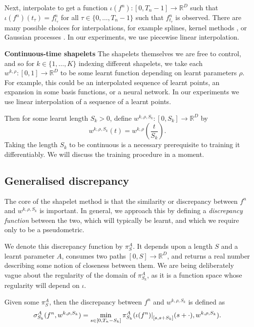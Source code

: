 \documentclass{article}
\theoremstyle{plain}
\theoremstyle{definition}
\newcommand{\reals}{\mathbb{R}}
\newcommand{\restr}[2]{{\left.\kern-\nulldelimiterspace #1 \right|_{#2}}}
\newcommand{\boldheading}[1]{

\textbf{#1}\quad}
\begin{document}
	Next, interpolate to get a function $\iota(f^n) \colon [0, T_n - 1] \to \reals^D$ such that $\iota(f^n)(t_\tau) = f^n_{t_\tau}$ for all $\tau \in \{0, \ldots, T_n - 1\}$ such that $f^n_{t_\tau}$ is observed. There are many possible choices for interpolations, for example splines, kernel methods \cite{interpolation-prediction}, or Gaussian processes \cite{li2016scalable, futoma2017mgp}. In our experiments, we use piecewise linear interpolation.
	
	\boldheading{Continuous-time shapelets}
	The shapelets themselves we are free to control, and so for $k \in \{1, \ldots, K\}$ indexing different shapelets, we take each $w^{k, \rho} \colon [0, 1] \to \reals^D$ to be some learnt function depending on learnt parameters $\rho$. For example, this could be an interpolated sequence of learnt points, an expansion in some basis functions, or a neural network. In our experiments we use linear interpolation of a sequence of a learnt points.
	
	Then for some learnt length $S_k > 0$, define $w^{k, \rho, S_k} \colon [0, S_k] \to \reals^D$ by
	\begin{equation*}
	w^{k, \rho, S_k}(t) = w^{k, \rho}\left(\frac{t}{S_k}\right).
	\end{equation*}
	Taking the length $S_k$ to be continuous is a necessary prerequisite to training it differentiably. We will discuss the training procedure in a moment.
	
	\subsection{Generalised discrepancy}
	The core of the shapelet method is that the similarity or discrepancy between $f^n$ and $w^{k, \rho, S_k}$ is important. In general, we approach this by defining a \emph{discrepancy function} between the two, which will typically be learnt, and which we require only to be a pseudometric.
	
	We denote this discrepancy function by $\pi^A_{S}$. It depends upon a length $S$ and a learnt parameter $A$, consumes two paths $[0, S] \to \reals^D$, and returns a real number describing some notion of closeness between them. We are being deliberately vague about the regularity of the domain of $\pi^A_{S_k}$, as it is a function space whose regularity will depend on $\iota$.	
	
	Given some $\pi^A_{S}$, then the discrepancy between $f^n$ and $w^{k, \rho, S_k}$ is defined as
	\begin{equation}\label{eq:new-sigma}
	\sigma^A_{S_k}(f^n, w^{k, \rho, S_k}) = \min_{s \in [0, T_n - S_k]} \pi^A_{S_k}(\restr{\iota(f^n)}{[s, s + S_k]}(s + \cdot), w^{k, \rho, S_k}).
	\end{equation}
	
\end{document}
